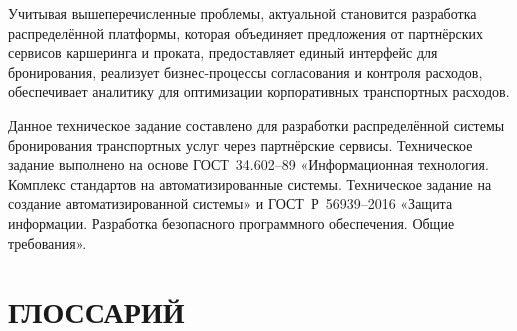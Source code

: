 \documentclass{bmstu}
\begin{document}
Учитывая вышеперечисленные проблемы, актуальной становится разработка распределённой платформы, которая объединяет предложения от партнёрских сервисов каршеринга и проката, предоставляет единый интерфейс для бронирования, реализует бизнес-процессы согласования и контроля расходов, обеспечивает аналитику для оптимизации корпоративных транспортных расходов.

Данное техническое задание составлено для разработки распределённой системы бронирования транспортных услуг через партнёрские сервисы. Техническое задание выполнено на основе ГОСТ~34.602--89 «Информационная технология. Комплекс стандартов на автоматизированные системы. Техническое задание на создание автоматизированной системы» и ГОСТ~Р~56939--2016 «Защита информации. Разработка безопасного программного обеспечения. Общие требования».


\newpage
\chapter*{ГЛОССАРИЙ}
\end{document}
